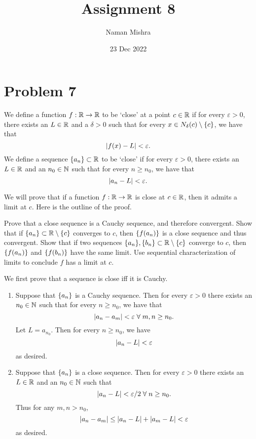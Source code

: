 \documentclass[12pt]{article}
\title{Assignment 8}
\author{Naman Mishra}
\date{23 Dec 2022}
\begin{document}
\maketitle

\section*{Problem 7}
We define a function $f : \mathbb{R} \to \mathbb{R}$ to be `close' at a point $c \in \mathbb{R}$ if for every $\varepsilon > 0$, there exists an $L \in \mathbb{R}$ and a $\delta > 0$ such that for every $x \in N_{\delta}(c) \setminus \set{c}$, we have that \[
    \abs{ f(x) - L } < \varepsilon.
\]
We define a sequence $\set{a_{n}} \subset \R$ to be `close' if for every $\varepsilon > 0$, there exists an $L \in \mathbb{R}$ and an $n_{0} \in \mathbb{N}$ such that for every $n \geq n_{0}$, we have that \[
    \abs{ a_{n} - L } < \varepsilon.
\]

We will prove that if a function $f : \mathbb{R} \to \mathbb{R}$ is close at $c \in \mathbb{R}$, then it admits a limit at $c$. Here is the outline of the proof.
\begin{outline}
    \1 Prove that a close sequence is a Cauchy sequence, and therefore convergent.
    \1 Show that if $\set{a_{n}} \subset \R \setminus \set{c}$ converges to $c$, then $\set{f(a_{n})}$ is a close sequence and thus convergent.
    \1 Show that if two sequences $\set{a_{n}}, \set{b_{n}} \subset \R \setminus \set{c}$ converge to $c$, then $\set{f(a_{n})}$ and $\set{f(b_{n})}$ have the same limit.
    \1 Use sequential characterization of limits to conclude $f$ has a limit at $c$.
\end{outline}

We first prove that a sequence is close iff it is Cauchy.
\begin{enumerate}[label=(\alph*)]
    \item Suppose that $\set{a_{n}}$ is a Cauchy sequence. Then for every $\varepsilon > 0$ there exists an $n_{0} \in \mathbb{N}$ such that for every $n \geq n_{0}$, we have that \[
        \abs{ a_{n} - a_{m} } < \varepsilon \;\forall\; m, n \geq n_{0}.
    \]
    Let $L = a_{n_{0}}$. Then for every $n \geq n_{0}$, we have \[
        \abs{ a_{n} - L } < \varepsilon
    \] as desired.
    
    \item Suppose that $\set{a_{n}}$ is a close sequence. Then for every $\varepsilon > 0$ there exists an $L \in \mathbb{R}$ and an $n_{0} \in \mathbb{N}$ such that \[
        \abs{ a_{n} - L } < \varepsilon / 2 \;\forall\; n \geq n_{0}.
    \] Thus for any $m, n > n_{0}$, \[
        \abs{ a_{n} - a_{m} } \leq \abs{ a_{n} - L } + \abs{ a_{m} - L } < \varepsilon
    \] as desired.
\end{enumerate}
\end{document}
